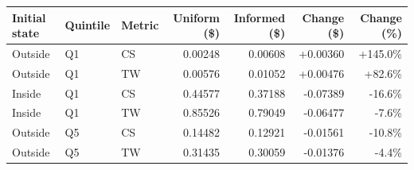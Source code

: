 \documentclass[11pt]{article}
\begin{document}
\begin{center}
\renewcommand{\arraystretch}{1.4}
\begin{tabular}{lllrrrr}
\toprule
Initial state & Quintile & Metric & Uniform (\$) & Informed (\$) & Change (\$) & Change (\%)\\
\midrule
Outside & Q1 & CS & 0.00248 & 0.00608 & +0.00360 & +145.0\% \\
Outside & Q1 & TW & 0.00576 & 0.01052 & +0.00476 & +82.6\% \\
\addlinespace
Inside & Q1 & CS & 0.44577 & 0.37188 & -0.07389 & -16.6\% \\
Inside & Q1 & TW & 0.85526 & 0.79049 & -0.06477 & -7.6\% \\
\addlinespace
Outside & Q5 & CS & 0.14482 & 0.12921 & -0.01561 & -10.8\% \\
Outside & Q5 & TW & 0.31435 & 0.30059 & -0.01376 & -4.4\% \\
\bottomrule
\end{tabular}
\end{center}
\end{document}
